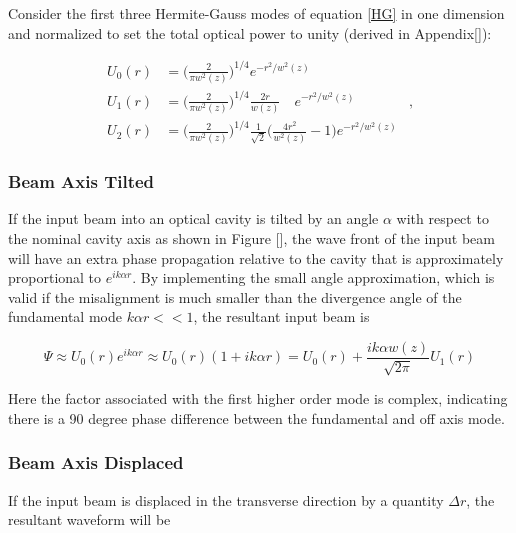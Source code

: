 		Consider the first three Hermite-Gauss modes of equation \ref{HG} in one dimension and normalized to set the total optical power to unity (derived in Appendix[]):

		\begin{equation}
		\label{Gauss1D}
		\begin{aligned}
				U_{0}(r) & =	\bigg( \frac{2}{\pi w^2(z)} \bigg)^{1/4}  e^{-r^2/w^2(z)}		&
		\\		U_{1}(r) &	=	\bigg( \frac{2}{\pi w^2(z)} \bigg)^{1/4}  \frac{2r}{w(z)} \quad e^{-r^2/w^2(z)}&,
		\\	 	U_{2}(r) &	=	\bigg( \frac{2}{\pi w^2(z)} \bigg)^{1/4}  \frac{1}{\sqrt{2}} \bigg( \frac{4r^2}{w^2(z)} - 1 \bigg)   e^{-r^2/w^2(z)}
		\end{aligned}
		\end{equation}
				
		
		\subsubsection{Beam Axis Tilted}
		If the input beam into an optical cavity is tilted by an angle $\alpha$ with respect to the nominal cavity axis as shown in Figure [], the wave front of the input beam will have an extra phase propagation relative to the cavity that is approximately proportional to $e^{ik \alpha r}$.  By implementing the small angle approximation, which is valid if the misalignment is much smaller than the divergence angle of the fundamental mode $k \alpha r << 1$, the resultant input beam is
		
		\begin{equation}
		\Psi \approx U_{0}(r) e^{ik \alpha r} \approx U_{0}(r) ( 1 + ik \alpha r ) =  U_{0}(r) + \frac{ik \alpha w(z)}{\sqrt{2\pi}} U_{1}(r)
		\end{equation}
		
		Here the factor associated with the first higher order mode is complex, indicating there is a 90 degree phase difference between the fundamental and off axis mode. 
		\subsubsection{Beam Axis Displaced}
		If the input beam is displaced in the transverse direction by a quantity $\Delta r$, the resultant waveform will be
		

